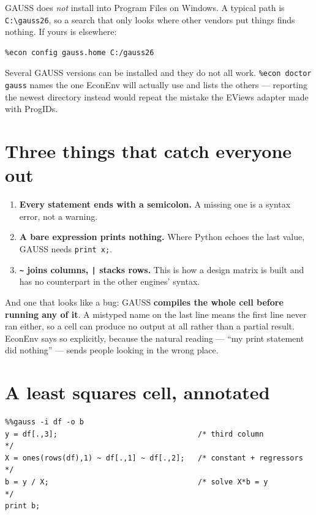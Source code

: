 \documentclass[11pt,a4paper]{report}
\begin{document}
\begin{warn}
GAUSS does \emph{not} install into Program Files on Windows. A typical path is
\texttt{C:\textbackslash gauss26}, so a search that only looks where other
vendors put things finds nothing. If yours is elsewhere:

\begin{lstlisting}
%econ config gauss.home C:/gauss26
\end{lstlisting}
\end{warn}

Several GAUSS versions can be installed and they do not all work.
\texttt{\%econ doctor gauss} names the one EconEnv will actually use and lists
the others --- reporting the newest directory instead would repeat the mistake
the EViews adapter made with ProgIDs.

\section{Three things that catch everyone out}

\begin{enumerate}
  \item \textbf{Every statement ends with a semicolon.} A missing one is a
        syntax error, not a warning.
  \item \textbf{A bare expression prints nothing.} Where Python echoes the last
        value, GAUSS needs \texttt{print x;}.
  \item \textbf{\texttt{\textasciitilde} joins columns, \texttt{|} stacks
        rows.} This is how a design matrix is built and has no counterpart in
        the other engines' syntax.
\end{enumerate}

\begin{warn}
And one that looks like a bug: GAUSS \textbf{compiles the whole cell before
running any of it}. A mistyped name on the last line means the first line never
ran either, so a cell can produce no output at all rather than a partial
result. EconEnv says so explicitly, because the natural reading --- ``my print
statement did nothing'' --- sends people looking in the wrong place.
\end{warn}

\section{A least squares cell, annotated}

\begin{lstlisting}
%%gauss -i df -o b
y = df[.,3];                                /* third column          */
X = ones(rows(df),1) ~ df[.,1] ~ df[.,2];   /* constant + regressors */
b = y / X;                                  /* solve X*b = y         */
print b;
\end{lstlisting}
\end{document}
